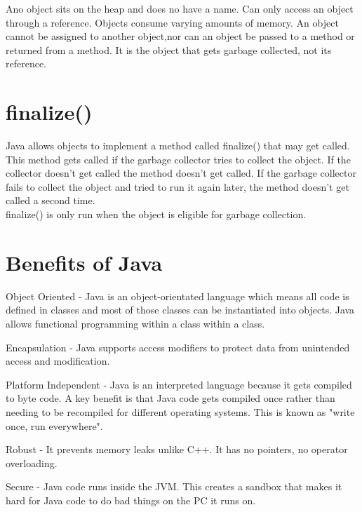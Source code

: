 \documentclass[a4paper]{report}   %
\begin{document}
Ano object sits on the heap and does no have a name. Can only access an object through a reference. Objects consume varying amounts of memory. An object cannot be assigned to another object,nor can an object be passed to a method or returned from a method. It is the object that gets garbage collected, not its reference.\\

\section{finalize()}

Java allows objects to implement a method called finalize() that may get called. This method gets called if the garbage collector tries to collect the object. If the collector doesn't get called  the method doesn't get called. If the garbage collector fails to collect the object and tried to run it again later, the method doesn't get called a second time.\\

finalize() is only run when the object is eligible for garbage collection. 

\section{Benefits of Java}

\begin{list}{•}{•}
\item Object Oriented - Java is an object-orientated language which means all code is defined in classes and most of those classes can be instantiated into objects. Java allows functional programming within a class within a class. 

\item Encapsulation - Java supports access modifiers to protect data from unintended access and modification.

\item Platform Independent - Java is an interpreted language because it gets compiled to byte code. A key benefit is that Java code gets compiled once rather than needing to be recompiled for different operating systems. This is known as "write once, run everywhere".

\item Robust - It prevents memory leaks unlike C++. It has no pointers, no operator overloading.

\item Secure - Java code runs inside the JVM. This creates a sandbox that makes it hard for Java code to do bad things on the PC it runs on.

\end{list}
\end{document}

